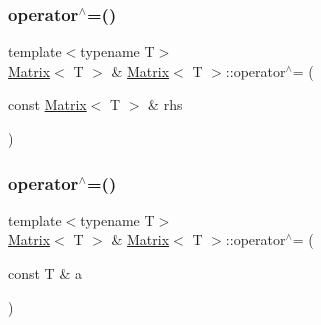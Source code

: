 \mbox{\label{classMatrix_acf14abe2000a4a41dae10db14b5d039c_acf14abe2000a4a41dae10db14b5d039c}} 
\subsubsection{\texorpdfstring{operator$^\wedge$=()}{operator^=()}\hspace{0.1cm}{\footnotesize\ttfamily [1/2]}}
{\footnotesize\ttfamily template$<$typename T$>$ \\
\mbox{\hyperlink{classMatrix}{Matrix}}$<$ T $>$ \& \mbox{\hyperlink{classMatrix}{Matrix}}$<$ T $>$\+::operator$^\wedge$= (\begin{DoxyParamCaption}\item[{const \mbox{\hyperlink{classMatrix}{Matrix}}$<$ T $>$ \&}]{rhs }\end{DoxyParamCaption})\hspace{0.3cm}{\ttfamily [inline]}}

\mbox{\label{classMatrix_af35faeb39342bf42c4470cf10630e32f_af35faeb39342bf42c4470cf10630e32f}} 
\subsubsection{\texorpdfstring{operator$^\wedge$=()}{operator^=()}\hspace{0.1cm}{\footnotesize\ttfamily [2/2]}}
{\footnotesize\ttfamily template$<$typename T$>$ \\
\mbox{\hyperlink{classMatrix}{Matrix}}$<$ T $>$ \& \mbox{\hyperlink{classMatrix}{Matrix}}$<$ T $>$\+::operator$^\wedge$= (\begin{DoxyParamCaption}\item[{const T \&}]{a }\end{DoxyParamCaption})\hspace{0.3cm}{\ttfamily [inline]}}

\mbox{\label{classMatrix_a8d10454cfe9427269b54a754262004b8_a8d10454cfe9427269b54a754262004b8}} 
